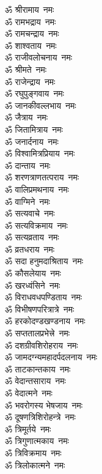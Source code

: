 \begin{multicols}{2}
\begin{flushleft}
ॐ श्रीरामाय~नमः\\
ॐ रामभद्राय~नमः\\
ॐ रामचन्द्राय~नमः\\
ॐ शाश्वताय~नमः\\
ॐ राजीवलोचनाय~नमः\\
ॐ श्रीमते~नमः\\
ॐ राजेन्द्राय~नमः\\
ॐ रघुपुङ्गवाय~नमः\\
ॐ जानकीवल्लभाय~नमः\\
ॐ जैत्राय~नमः\hfill{}\\
ॐ जितामित्राय~नमः\\
ॐ जनार्दनाय~नमः\\
ॐ विश्वामित्रप्रियाय~नमः\\
ॐ दान्ताय~नमः\\
ॐ शरणत्राणतत्पराय~नमः\\
ॐ वालिप्रमथनाय~नमः\\
ॐ वाग्मिने~नमः\\
ॐ सत्यवाचे~नमः\\
ॐ सत्यविक्रमाय~नमः\\
ॐ सत्यव्रताय~नमः\hfill{}\\
ॐ व्रतधराय~नमः\\
ॐ सदा हनुमदाश्रिताय~नमः\\
ॐ कौसलेयाय~नमः\\
ॐ खरध्वंसिने~नमः\\
ॐ विराधवधपण्डिताय~नमः\\
ॐ विभीषणपरित्रात्रे~नमः\\
ॐ हरकोदण्डखण्डनाय~नमः\\
ॐ सप्ततालप्रभेत्त्रे~नमः\\
ॐ दशग्रीवशिरोहराय~नमः\\
ॐ जामदग्न्यमहादर्पदलनाय~नमः\hfill{}\\
ॐ ताटकान्तकाय~नमः\\
ॐ वेदान्तसाराय~नमः\\
ॐ वेदात्मने~नमः\\
ॐ भवरोगस्य भेषजाय~नमः\\
ॐ दूषणत्रिशिरोहन्त्रे~नमः\\
ॐ त्रिमूर्तये~नमः\\
ॐ त्रिगुणात्मकाय~नमः\\
ॐ त्रिविक्रमाय~नमः\\
ॐ त्रिलोकात्मने~नमः\\

\end{flushleft}
\end{multicols}

